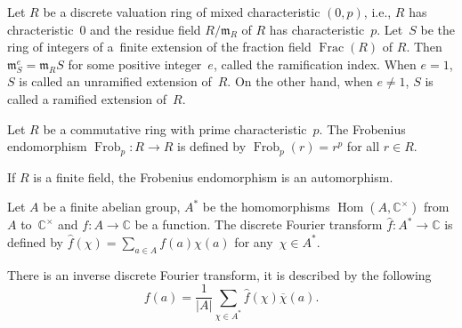 \begin{Definition}
Let $R$ be a discrete valuation ring of mixed characteristic $(0,p)$, i.e., $R$ has chracteristic~0 and the residue field $R/\mathfrak{m}_R$ of $R$ has characteristic~$p$. Let~$S$ be the ring of integers of a~finite extension of the fraction field $\operatorname{Frac}(R)$ of $R$. Then $\mathfrak{m}^e_S=\mathfrak{m}_RS$ for some positive integer~$e$, called the ramification index. When $e=1$, $S$ is called an unramified extension of~$R$. On the other hand, when $e\neq 1$, $S$ is called a ramified extension of~$R$.
\end{Definition}

\begin{Definition}
Let $R$ be a commutative ring with prime characteristic~$p$. The Frobenius endomorphism $\operatorname{Frob}_p\colon R\rightarrow R$ is defined by $\operatorname{Frob}_p(r)=r^p$ for all $r\in R$.
\end{Definition}

If $R$ is a finite field, the Frobenius endomorphism is an automorphism.

\begin{Definition}
Let $A$ be a finite abelian group, $A^*$ be the homomorphisms $\operatorname{Hom}(A,\mathbb{C}^\times)$ from~$A$ to~$\mathbb{C}^\times$ and $f\colon A \rightarrow \mathbb{C}$ be a function. The discrete Fourier transform $\hat{f}\colon A^*\rightarrow \mathbb{C}$ is defined by $\hat{f}(\chi)=\sum_{a \in A}f(a)\chi (a)$ for any~$\chi \in A^*$.
\end{Definition}

There is an inverse discrete Fourier transform, it is described by the following
\[
f(a)=\frac{1}{|A|}\sum_{\chi \in A^*}\hat{f}(\chi)\overline{\chi}(a).
\]
